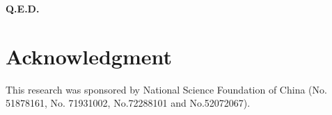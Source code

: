 \documentclass[journal]{IEEEtran}
\begin{document}
\textbf{Q.E.D.}


%





\section*{Acknowledgment}


This research was sponsored by National Science Foundation of China (No. 51878161, No. 71931002, No.72288101 and No.52072067).


\ifCLASSOPTIONcaptionsoff
  \newpage
\fi
\end{document}
